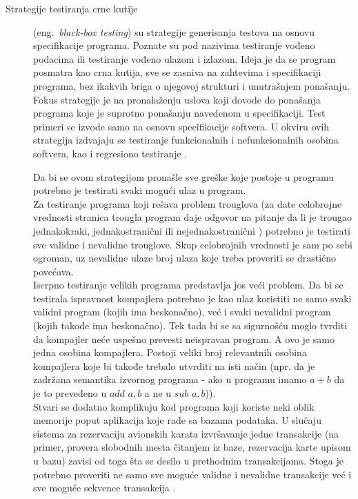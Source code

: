 \documentclass[12pt,oneside]{memoir}
\begin{document}
\begin{description}
\item [Strategije testiranja crne kutije] (eng.~\textit{black-box testing}) su strategije generisanja testova na osnovu specifikacije programa. Poznate su pod nazivima testiranje vođeno podacima ili testiranje vođeno ulazom i izlazom. Ideja je da se program posmatra kao crna kutija, sve se zasniva na zahtevima i specifikaciji programa, bez ikakvih briga o njegovoj strukturi i unutrašnjem ponašanju. Fokus strategije je na pronalaženju uslova koji dovode do ponašanja programa koje je suprotno ponašanju navedenom u specifikaciji. Test primeri se izvode samo na osnovu specifikacije softvera. U okviru ovih strategija izdvajaju se testiranje funkcionalnih i nefunkcionalnih osobina softvera, kao i regresiono testiranje \cite{mvj, ArtOfST, PGtSTD}.

Da bi se ovom strategijom pronašle sve greške koje postoje u programu potrebno je testirati svaki mogući ulaz u program. \\
Za testiranje programa koji rešava problem trouglova (za date celobrojne vrednosti stranica trougla program daje odgovor na pitanje da li je trougao jednakokraki, jednakostranični ili nejednakostranični \cite{schlingloff} %
) potrebno je testirati sve validne i nevalidne trouglove. Skup celobrojnih vrednosti je sam po sebi ogroman, uz nevalidne ulaze broj ulaza koje treba proveriti se drastično povećava.\\
Iscrpno testiranje velikih programa predstavlja jos veći problem. Da bi se testirala ispravnost kompajlera potrebno je kao ulaz koristiti ne samo svaki validni program (kojih ima beskonačno), već i svaki nevalidni program (kojih takođe ima beskonačno). Tek tada bi se sa sigurnošću moglo tvrditi da kompajler neće uspešno prevesti neispravan program. A ovo je samo jedna osobina kompajlera. Postoji veliki broj relevantnih osobina kompajlera koje bi takođe trebalo utvrditi na isti način (npr. da je zadržana semantika izvornog programa - ako u programu imamo $a+b$ da je to prevedeno u $add$ $a, b$ a ne u $sub$ $a, b$)). \\
Stvari se dodatno komplikuju kod programa koji koriste neki oblik memorije poput aplikacija koje rade sa bazama podataka. U slučaju sistema za rezervaciju avionskih karata izvršavanje jedne transakcije (na primer, provera slobodnih mesta čitanjem iz baze, rezervacija karte upisom u bazu) zavisi od toga šta se desilo u prethodnim transakcijama. Stoga je potrebno proveriti ne samo sve moguće validne i nevalidne transakcije već i sve moguće sekvence transakcija \cite{ArtOfST}.


\end{description}
\end{document}
